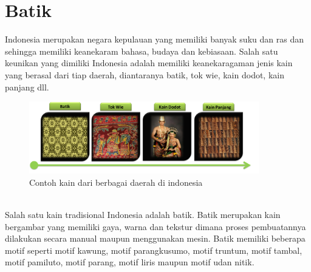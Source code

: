 \section{Batik}
Indonesia merupakan negara kepulauan yang memiliki banyak suku dan ras dan sehingga memiliki keanekaram bahasa, budaya dan kebiasaan. Salah satu keunikan yang dimiliki Indonesia adalah memiliki keanekaragaman jenis kain yang berasal dari tiap daerah, diantaranya batik, tok wie, kain dodot, kain panjang dll.\\
\begin{figure}[htp]
	\centering
	\includegraphics[width=10cm]{pics/kain_indonesia}
	\caption{Contoh kain dari berbagai daerah di indonesia}
	\label{fig:kain_indonesia}
\end{figure}\\
Salah satu kain tradisional Indonesia adalah batik. Batik merupakan kain bergambar yang memiliki gaya, warna dan tekstur dimana proses pembuatannya dilakukan secara manual maupun menggunakan mesin. Batik memiliki beberapa motif seperti motif kawung, motif parangkusumo, motif truntum, motif tambal, motif pamiluto, motif parang, motif liris maupun motif udan nitik.
